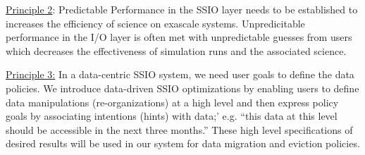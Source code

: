 \underline{Principle 2}: Predictable Performance in the SSIO layer needs to be established to increases the efficiency of science on exascale systems. Unpredicitable performance in the I/O layer is often met with unpredictable guesses from users which decreases the effectiveness of simulation runs and the associated science.

\underline{Principle 3:} In a data-centric SSIO system, we need user goals to define the data policies. We introduce data-driven
SSIO optimizations by enabling users to define data manipulations (re-organizations) at a high level and then express
policy goals by associating intentions (hints) with data;' e.g. ``this data at this level should be accessible in the next three months.''
These high level specifications of desired results will be used in our system for data migration and eviction policies.



%

%


%

% 
% 

%
%


%

%


% 



